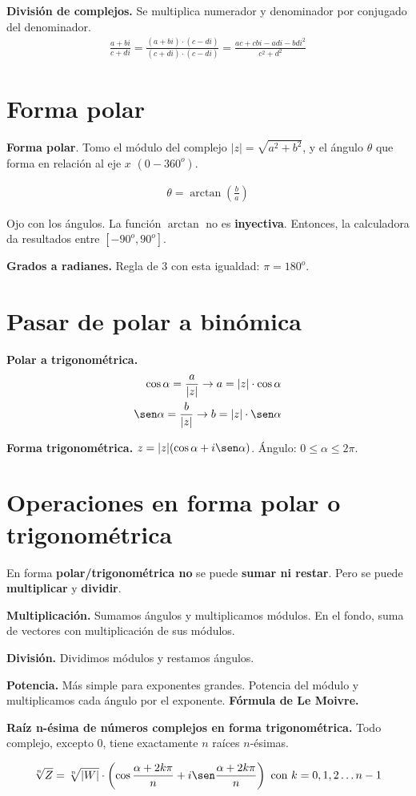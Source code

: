 \documentclass{article}
\begin{document}
\textbf{División de complejos.}
Se multiplica numerador y denominador por conjugado del denominador.
\begin{align*}
    \frac{a+bi}{c+di} = \frac{(a+bi) \cdot (c-di)}{(c+di) \cdot (c-di)} =
    \frac{ac + cbi - adi - bdi^2}{c^2 + d^2}
\end{align*}

\section*{Forma polar}

\textbf{Forma polar}.
Tomo el módulo del complejo \(|z| = \sqrt{a^2 + b^2}\),
y el ángulo \(\theta\) que forma en relación al eje \(x\) \((0-360^o)\).

\begin{align*}
    \theta = \arctan \left(\frac{b}{a}\right)
\end{align*}

Ojo con los ángulos.
La función \(\arctan\) no es \textbf{inyectiva}.
Entonces, la calculadora da resultados entre \([-90^o,90^o]\).

\textbf{Grados a radianes.}
Regla de 3 con esta igualdad: \(\pi = 180^o\).

\section*{Pasar de polar a binómica}

\textbf{Polar a trigonométrica.}
\begin{align*}
    \cos \alpha = \frac{a}{|z|} \rightarrow a = |z| \cdot \cos \alpha \\
    \sen \alpha = \frac{b}{|z|} \rightarrow b = |z| \cdot \sen \alpha \\
\end{align*}

\textbf{Forma trigonométrica.} 
\(z = |z| (\cos \alpha + i \sen \alpha)\). Ángulo: \(0 \leq \alpha \leq 2\pi\).

\section*{Operaciones en forma polar o trigonométrica}

En forma \textbf{polar/trigonométrica no} se puede \textbf{sumar ni restar}.
Pero se puede \textbf{multiplicar} y \textbf{dividir}.

\textbf{Multiplicación.} 
Sumamos ángulos y multiplicamos módulos. 
En el fondo, suma de vectores con multiplicación de sus módulos.

\textbf{División.}
Dividimos módulos y restamos ángulos.

\textbf{Potencia.}
Más simple para exponentes grandes. 
Potencia del módulo 
y multiplicamos cada ángulo por el exponente.
\textbf{Fórmula de Le Moivre.}

\textbf{Raíz n-ésima de números complejos en forma trigonométrica.}
Todo complejo, excepto 0, tiene exactamente \(n\) raíces \(n\)-ésimas.

\begin{align*}
    \sqrt[n]{Z} = \sqrt[n]{|W|} \cdot \left(\cos \frac{\alpha + 2k\pi}{n} + i \sen \frac{\alpha + 2k\pi}{n}\right) \text{ con } k=0,1,2 \dots n-1
\end{align*}
\end{document}
